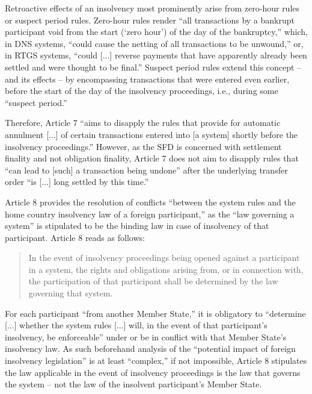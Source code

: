 Retroactive effects of an insolvency most prominently arise from zero-hour rules or suspect period rules.
Zero-hour rules render ``all transactions by a bankrupt participant void from the start (`zero hour') of the day of the bankruptcy,'' which, in DNS systems, ``could cause the netting of all transactions to be unwound,'' or, in RTGS systems, ``could [...] reverse payments that have apparently already been settled and were thought to be final.'' \autocite[17]{cpmi2001}
Suspect period rules extend this concept -- and its effects -- by encompassing transactions that were entered even earlier, before the start of the day of the insolvency proceedings, i.e., during some ``suspect period.'' \autocite[57]{vereecken2003}

Therefore, Article 7 ``aims to disapply the rules that provide for automatic annulment [...] of certain transactions entered into [a system] shortly before the insolvency proceedings.'' \autocite[57]{vereecken2003}
However, as the SFD is concerned with settlement finality and not obligation finality, Article 7 does not aim to disapply rules that ``can lead to [such] a transaction being undone'' after the underlying transfer order ``is [...] long settled by this time.'' \autocite[57]{vereecken2003}

Article 8 provides the resolution of conflicts ``between the system rules and the home country insolvency law of a foreign participant,'' as the ``law governing a system'' is stipulated to be the binding law in case of insolvency of that participant. \autocite[19]{cpmi2001}
Article 8 reads as follows: \autocite{eu1998sfd}

\begin{quote}
	In the event of insolvency proceedings being opened against a participant in a system, the rights and obligations arising from, or in connection with, the participation of that participant shall be determined by the law governing that system.
\end{quote}

For each participant ``from another Member State,'' it is obligatory to ``determine [...] whether the system rules [...] will, in the event of that participant's insolvency, be enforceable'' under or be in conflict with that Member State's insolvency law. \autocite[58]{vereecken2003}
As such beforehand analysis of the ``potential impact of foreign insolvency legislation'' is at least ``complex,'' if not impossible, \autocite[58]{vereecken2003} Article 8 stipulates the law applicable in the event of insolvency proceedings is the law that governs the system -- not the law of the insolvent participant's Member State.

